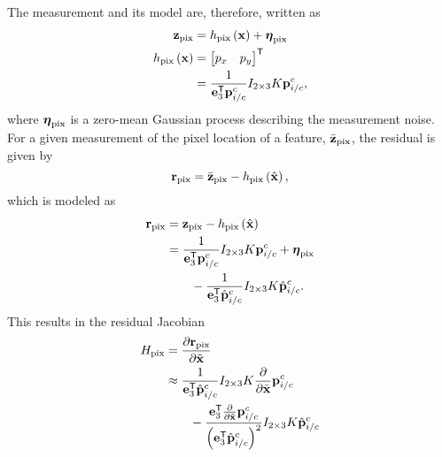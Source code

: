 The measurement and its model are, therefore, written as
\begin{align}
  \boldsymbol{\mathrm{z}}_{\text{pix}} 
  &= h_{\text{pix}} \left( \boldsymbol{\mathrm{x}} \right) + \boldsymbol{\mathrm{\eta}}_{\text{pix}} \\
  h_{\text{pix}} \left( \boldsymbol{\mathrm{x}} \right)
  &= \begin{bmatrix} p_x & p_y \end{bmatrix}^{\mathsf{T}} \\
  &= \frac{1}{\boldsymbol{\mathrm{e}}_3^{\mathsf{T}} \boldsymbol{\mathrm{p}}_{i/c}^c} I_{2 \times 3} K
  \boldsymbol{\mathrm{p}}_{i/c}^c,
\end{align}
where $\boldsymbol{\mathrm{\eta}}_{\text{pix}}$ is a zero-mean Gaussian process describing the
measurement noise.
For a given measurement of the pixel location of a feature,
$\bar{\boldsymbol{\mathrm{z}}}_{\text{pix}}$, the residual is given by
\begin{equation}
  \boldsymbol{\mathrm{r}}_{\text{pix}} = \bar{\boldsymbol{\mathrm{z}}}_{\text{pix}} - h_{\text{pix}} \left( \hat{\boldsymbol{\mathrm{x}}}
    \right),
\end{equation}
which is modeled as
\begin{align}
  \vect{r}_{\text{pix}} &= \vect{z}_{\text{pix}} - h_{\text{pix}} \left( \hat{\x}
    \right) \\
  &= \frac{1}{\e_3^\transpose \vect{p}_{i/c}^c} I_{2 \times 3} K
  \vect{p}_{i/c}^c + \vect{\eta}_{\text{pix}} \\
  & \qquad - \frac{1}{\e_3^\transpose \hat{\vect{p}}_{i/c}^c} I_{2 \times 3} K
  \hat{\vect{p}}_{i/c}^c. \nonumber
  \label{eq:rpix}
\end{align}
This results in the residual Jacobian
\begin{align}
  H_{\text{pix}} &= \frac{ \partial \boldsymbol{\mathrm{r}}_{\text{pix}} }{ \partial \tilde{\boldsymbol{\mathrm{x}}}} \\
  &\approx
  \frac{1}{\boldsymbol{\mathrm{e}}_3^{\mathsf{T}} \hat{\boldsymbol{\mathrm{p}}}_{i/c}^c} I_{2 \times 3} K
 \frac{\partial}{\partial \tilde{\boldsymbol{\mathrm{x}}}} \boldsymbol{\mathrm{p}}_{i/c}^c  \\
  & \qquad - \frac{\boldsymbol{\mathrm{e}}_3^{\mathsf{T}} \frac{\partial}{\partial \tilde{\boldsymbol{\mathrm{x}}}} 
 \boldsymbol{\mathrm{p}}_{i/c}^c}{\left( \boldsymbol{\mathrm{e}}_3^{\mathsf{T}}
 \hat{\boldsymbol{\mathrm{p}}}_{i/c}^c \right)^2 } I_{2 \times 3} K
 \hat{\boldsymbol{\mathrm{p}}}_{i/c}^c \nonumber
\end{align}
